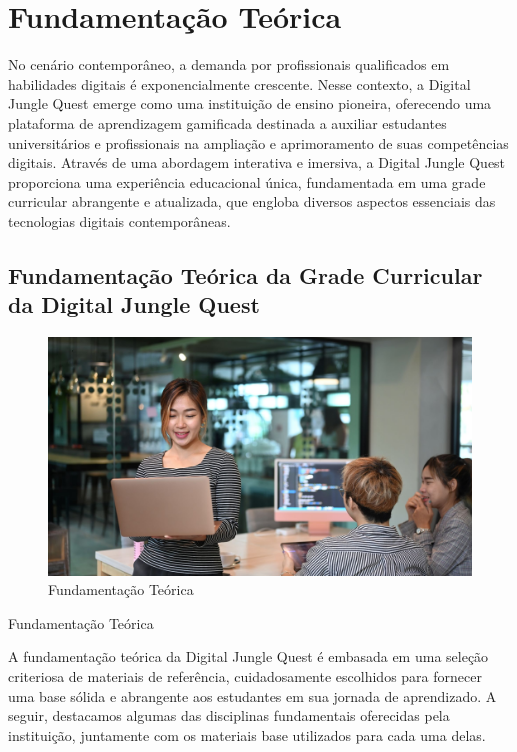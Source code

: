 \chapter{Fundamentação Teórica}
\label{ch:Fundamentação_Teorica}
	\begin{resumocapitulo}
		No cenário contemporâneo, a demanda por profissionais qualificados em habilidades digitais é exponencialmente crescente. Nesse contexto, a Digital Jungle Quest emerge como uma instituição de ensino pioneira, oferecendo uma plataforma de aprendizagem gamificada destinada a auxiliar estudantes universitários e profissionais na ampliação e aprimoramento de suas competências digitais. Através de uma abordagem interativa e imersiva, a Digital Jungle Quest proporciona uma experiência educacional única, fundamentada em uma grade curricular abrangente e atualizada, que engloba diversos aspectos essenciais das tecnologias digitais contemporâneas.
	\end{resumocapitulo}

	\section{Fundamentação Teórica da Grade Curricular da Digital Jungle Quest}

\begin{figure}
\centering
\includegraphics[width=0.75\linewidth]{figuras/fundamentação.jpg}
\caption{Fundamentação Teórica}
\end{figure}

Fundamentação Teórica

A fundamentação teórica da Digital Jungle Quest é embasada em uma seleção criteriosa de materiais de referência, cuidadosamente escolhidos para fornecer uma base sólida e abrangente aos estudantes em sua jornada de aprendizado. A seguir, destacamos algumas das disciplinas fundamentais oferecidas pela instituição, juntamente com os materiais base utilizados para cada uma delas.

